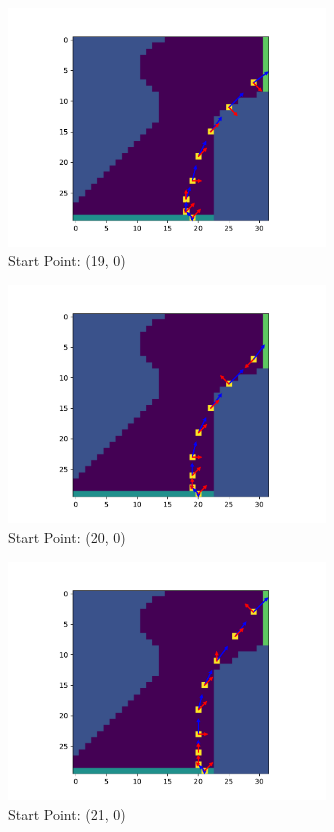 \documentclass{article}
\begin{document}
\begin{figure}[H]
	\centering
	\includegraphics[width=0.75\textwidth]{../figure/fig_19}
	\caption{Start Point: (19, 0)}
	\label{fig:fig_19}
\end{figure}


\begin{figure}[H]
	\centering
	\includegraphics[width=0.75\textwidth]{../figure/fig_20}
	\caption{Start Point: (20, 0)}
	\label{fig:fig_20}
\end{figure}


\begin{figure}[H]
	\centering
	\includegraphics[width=0.75\textwidth]{../figure/fig_21}
	\caption{Start Point: (21, 0)}
	\label{fig:fig_21}
\end{figure}
\end{document}
